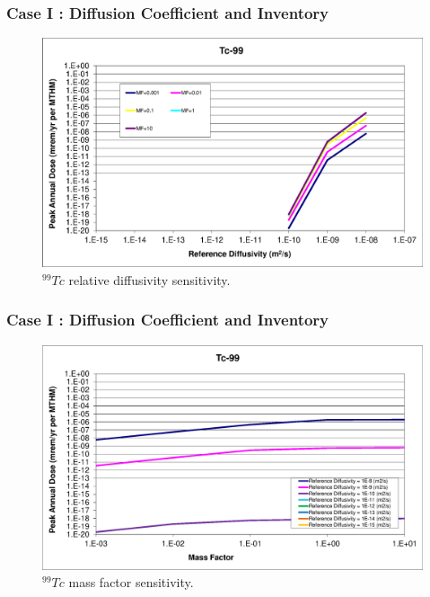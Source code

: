 \begin{frame}[c]
  \frametitle{Case I : Diffusion Coefficient and Inventory}

\begin{figure}[ht!]
\centering
\includegraphics[width=\linewidth]{DiffCoeffAndInvEBSFail/Tc-99.eps}
\caption{$^{99}Tc$ relative diffusivity sensitivity.} 
\label{fig:DCInvTc99}
\end{figure}
\end{frame}

\begin{frame}[c]
  \frametitle{Case I : Diffusion Coefficient and Inventory}

\begin{figure}[ht!]
\centering
\includegraphics[width=\linewidth]{DiffCoeffAndInvEBSFail/Tc-99-MF.eps}
\caption{$^{99}Tc$ mass factor sensitivity.}
\label{fig:DCInvTc99MF}
\end{figure}
\end{frame}

